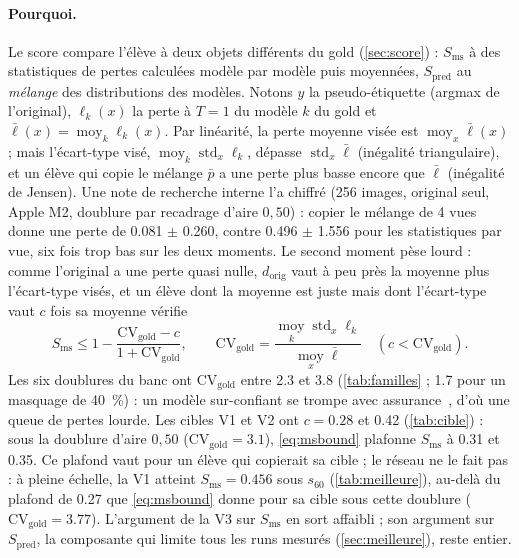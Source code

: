 \documentclass[11pt,a4paper]{article}
\newcommand{\Exp}{\operatorname*{moy}}
\newcommand{\orig}{\mathrm{orig}}
\newcommand{\gold}{\mathrm{gold}}
\begin{document}
\paragraph{Pourquoi.} Le score compare l'élève à deux objets différents du gold
(\cref{sec:score}) : $S_{\text{ms}}$ à des statistiques de pertes calculées modèle par modèle puis
moyennées, $S_{\text{pred}}$ au \emph{mélange} des distributions des modèles. Notons $y$ la
pseudo-étiquette (argmax de l'original), $\ell_k(x)$ la perte à $T=1$ du modèle $k$ du gold et
$\bar\ell(x)=\Exp_k\ell_k(x)$. Par linéarité, la perte moyenne visée est $\Exp_x\bar\ell(x)$ ;
mais l'écart-type visé, $\Exp_k\operatorname{std}_x\ell_k$, dépasse $\operatorname{std}_x\bar\ell$
(inégalité triangulaire), et un élève qui copie le mélange $\bar p$ a une perte plus basse encore
que $\bar\ell$ (inégalité de Jensen). Une note de recherche interne l'a chiffré (256 images,
original seul, Apple M2, doublure par recadrage d'aire $0{,}50$) : copier le mélange de 4 vues donne
une perte de \num{0.081} $\pm$ \num{0.260}, contre \num{0.496} $\pm$ \num{1.556} pour les
statistiques par vue, six fois trop bas sur les deux moments. Le second moment pèse lourd : comme
l'original a une perte quasi nulle, $d_\orig$ vaut à peu près la moyenne plus l'écart-type visés,
et un élève dont la moyenne est juste mais dont l'écart-type vaut $c$ fois sa moyenne vérifie
\begin{equation}\label{eq:msbound}
  S_{\text{ms}}\le 1-\frac{\mathrm{CV}_\gold-c}{1+\mathrm{CV}_\gold},\qquad
  \mathrm{CV}_\gold=\frac{\Exp_k\operatorname{std}_x\ell_k}{\Exp_x\bar\ell}\quad(c<\mathrm{CV}_\gold).
\end{equation}
Les six doublures du banc ont $\mathrm{CV}_\gold$ entre \num{2.3} et \num{3.8}
(\cref{tab:familles} ; \num{1.7} pour un masquage de \SI{40}{\percent}) : un modèle sur-confiant se trompe avec assurance~\cite{guo2017}, d'où une
queue de pertes lourde. Les cibles V1 et V2 ont $c=\num{0.28}$ et \num{0.42} (\cref{tab:cible}) :
sous la doublure d'aire $0{,}50$ ($\mathrm{CV}_\gold=\num{3.1}$), \eqref{eq:msbound} plafonne
$S_{\text{ms}}$ à \num{0.31} et \num{0.35}. Ce plafond vaut pour un élève qui copierait sa cible ;
le réseau ne le fait pas : à pleine échelle, la V1 atteint $S_{\text{ms}}=\num{0.456}$ sous
$s_{60}$ (\cref{tab:meilleure}), au-delà du plafond de \num{0.27} que \eqref{eq:msbound} donne pour
sa cible sous cette doublure ($\mathrm{CV}_\gold=\num{3.77}$). L'argument de la V3 sur
$S_{\text{ms}}$ en sort affaibli ; son argument sur $S_{\text{pred}}$, la composante qui limite tous
les runs mesurés (\cref{sec:meilleure}), reste entier.
\end{document}
